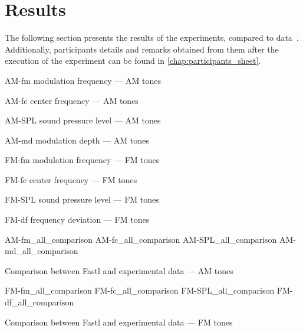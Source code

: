 \documentclass[../main.tex]{subfiles}
\begin{document}
\section{Results}

The following section presents the results of the experiments, compared to
\citeauthor{Fastl2007Psychoacoustics} data~\cite{Fastl2007Psychoacoustics}.
Additionally, participants details and remarks obtained from them after the
execution of the experiment can be found in \cref{chap:participants_sheet}.

\begin{experimentalresults}

\myfigurefastlexpstds%
  {AM-fm}
  {modulation frequency --- AM tones}

\myfigurefastlexpstds%
  {AM-fc}
  {center frequency --- AM tones}

\myfigurefastlexpstds%
  {AM-SPL}
  {sound pressure level --- AM tones}

\myfigurefastlexpstds%
  {AM-md}
  {modulation depth --- AM tones}

\myfigurefastlexpstds%
  {FM-fm}
  {modulation frequency --- FM tones}

\myfigurefastlexpstds%
  {FM-fc}
  {center frequency --- FM tones}

\myfigurefastlexpstds%
  {FM-SPL}
  {sound pressure level --- FM tones}

\myfigurefastlexpstds%
  {FM-df}
  {frequency deviation --- FM tones}

\myfigurequad%
  {AM-fm_all_comparison}
  {AM-fc_all_comparison}
  {AM-SPL_all_comparison}
  {AM-md_all_comparison}
  {
    \caption{Comparison between Fastl and experimental data --- AM tones}
    \label{fig:am_comparison}
  }

\myfigurequad%
  {FM-fm_all_comparison}
  {FM-fc_all_comparison}
  {FM-SPL_all_comparison}
  {FM-df_all_comparison}
  {
    \caption{Comparison between Fastl and experimental data --- FM tones}
    \label{fig:fm_comparison}
  }

\end{experimentalresults}
\end{document}
